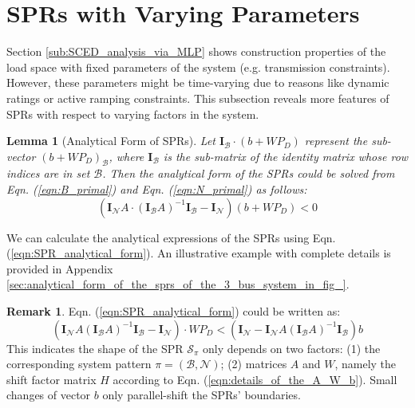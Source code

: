 \documentclass[letterpaper, 11pt]{article}
\theoremstyle{plain}
\newtheorem{lem}{Lemma}
\theoremstyle{definition}
\newtheorem{remark}{Remark}
\begin{document}
\section{SPRs with Varying Parameters} \label{sec:sprs_with_varying_parameters}

Section \ref{sub:SCED_analysis_via_MLP} shows construction properties of the load space with fixed parameters of the system (e.g. transmission constraints). However, these parameters might be time-varying due to reasons like dynamic ratings or active ramping constraints. This subsection reveals more features of SPRs with respect to varying factors in the system.


\begin{lem}[Analytical Form of SPRs]
Let $\mathbf{I}_{\mathcal{B}} \cdot (b+WP_D)$ represent the sub-vector $(b+WP_D)_{\mathcal{B}}$, where $\mathbf{I}_{\mathcal{B}}$ is the sub-matrix of the identity matrix  whose row indices are in set $\mathcal{B}$.
Then the analytical form of the SPRs could be solved from Eqn. (\ref{eqn:B_primal}) and Eqn. (\ref{eqn:N_primal}) as follows:
\begin{equation}
\label{eqn:SPR_analytical_form}
(\mathbf{I}_{\mathcal{N}}A\cdot (\mathbf{I}_{\mathcal{B}}A)^{-1}\mathbf{I}_{\mathcal{B}}-\mathbf{I}_{\mathcal{N}})(b+W P_D) < 0 
\end{equation}
\end{lem}
We can calculate the analytical expressions of the SPRs using Eqn. (\ref{eqn:SPR_analytical_form}). An illustrative example with complete details is provided in Appendix \ref{sec:analytical_form_of_the_sprs_of_the_3_bus_system_in_fig_}.

\begin{remark}
Eqn. (\ref{eqn:SPR_analytical_form}) could be written as:
\begin{equation}
\label{eqn:SPR_shape}
(\mathbf{I}_{\mathcal{N}}A (\mathbf{I}_{\mathcal{B}}A)^{-1}\mathbf{I}_{\mathcal{B}}-\mathbf{I}_{\mathcal{N}})\cdot W P_D < (\mathbf{I}_{\mathcal{N}}-\mathbf{I}_{\mathcal{N}}A (\mathbf{I}_{\mathcal{B}}A)^{-1}\mathbf{I}_{\mathcal{B}})b
\end{equation}
This indicates the shape of the SPR $\mathcal{S}_{\pi}$ only depends on two factors: (1) the corresponding system pattern $\pi = (\mathcal{B},\mathcal{N})$; (2) matrices $A$ and $W$, namely the shift factor matrix $H$ according to Eqn. (\ref{eqn:details_of_the_A_W_b}).
Small changes of vector $b$ only parallel-shift the SPRs' boundaries.
\end{remark}
\end{document}
